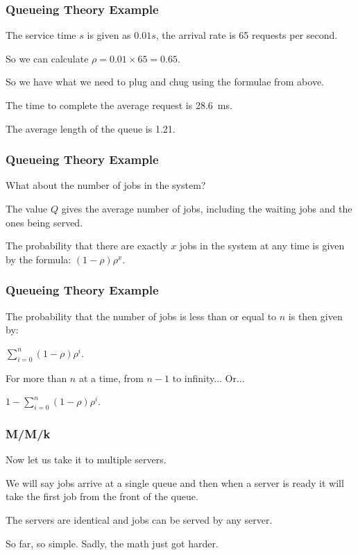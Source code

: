 \begin{frame}
\frametitle{Queueing Theory Example}

The service time $s$ is given as $0.01s$, the arrival rate is 65 requests per second. 

So we can calculate $\rho = 0.01 \times 65 = 0.65$. 

So we have what we need to plug and chug using the formulae from above. 

The time to complete the average request is 28.6~ms. 

The average length of the queue is 1.21.

\end{frame}



\begin{frame}
\frametitle{Queueing Theory Example}

What about the number of jobs in the system? 

The value $Q$ gives the average number of jobs, including the waiting jobs and the ones being served.  

The probability that there are exactly $x$ jobs in the system at any time is given by the formula: $(1-\rho)\rho^{x}$.

\end{frame}



\begin{frame}
\frametitle{Queueing Theory Example}

The probability that the number of jobs is less than or equal to $n$ is then given by: 

$\sum\limits_{i=0}^{n}(1-\rho)\rho^{i}$.

For more than $n$ at a time, from $n-1$ to infinity... Or...

$1 - \sum\limits_{i=0}^{n}(1-\rho)\rho^{i}$.

\end{frame}



\begin{frame}
\frametitle{M/M/k}

Now let us take it to multiple servers. 

We will say jobs arrive at a single queue and then when a server is ready it will take the first job from the front of the queue. 

The servers are identical and jobs can be served by any server. 

So far, so simple. Sadly, the math just got harder. 

\end{frame}




